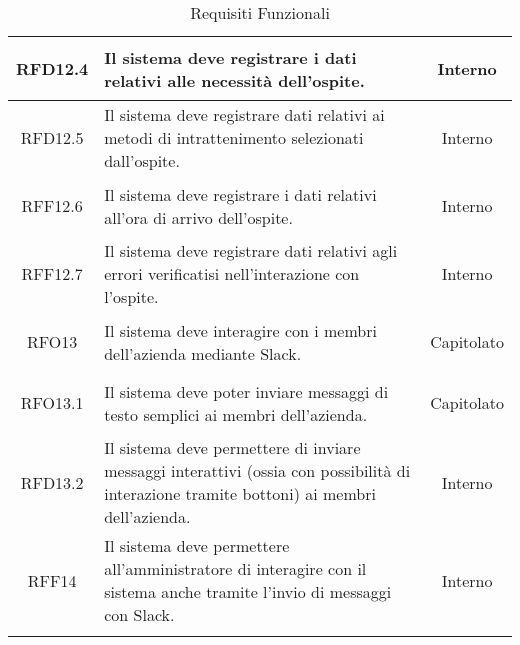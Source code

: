 \begin{longtable}{|c|>{\centering}m{7cm}|c|}
\hypertarget{RFD12.4}{RFD12.4} & Il sistema deve registrare i dati relativi alle necessità dell'ospite. & Interno\\ \hline
\hypertarget{RFD12.5}{RFD12.5} & Il sistema deve registrare dati relativi ai metodi di intrattenimento selezionati dall'ospite. & Interno\\ \hline
\hypertarget{RFF12.6}{RFF12.6} & Il sistema deve registrare i dati relativi all'ora di arrivo dell'ospite. & Interno\\ \hline
\hypertarget{RFF12.7}{RFF12.7} & Il sistema deve registrare dati relativi agli errori verificatisi nell'interazione con l'ospite. & Interno\\ \hline
\hypertarget{RFO13}{RFO13} & Il sistema deve interagire con i membri dell'azienda mediante Slack. & Capitolato\\ \hline
\hypertarget{RFO13.1}{RFO13.1} & Il sistema deve poter inviare messaggi di testo semplici ai membri dell'azienda. & Capitolato\\ \hline
\hypertarget{RFD13.2}{RFD13.2} & Il sistema deve permettere di inviare messaggi interattivi (ossia con possibilità di interazione tramite bottoni) ai membri dell'azienda. & Interno\\ \hline
\hypertarget{RFF14}{RFF14} & Il sistema deve permettere all'amministratore di interagire con il sistema anche tramite l'invio di messaggi con Slack. & Interno\\ \hline

\caption[Requisiti Funzionali]{Requisiti Funzionali}
\label{tabella:req0}
\end{longtable}
\clearpage
